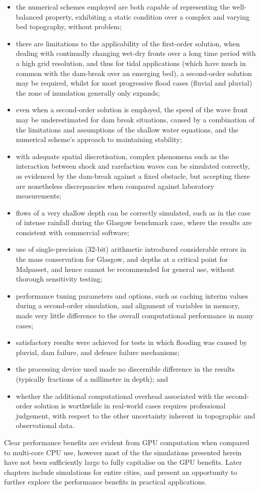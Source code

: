 \begin{itemize}
	\item the numerical schemes employed are both capable of representing the well-balanced property, exhibiting a static condition over a complex and varying bed topography, without problem;
	\item there are limitations to the applicability of the first-order solution, when dealing with continually changing wet-dry fronts over a long time period with a high grid resolution, and thus for tidal applications (which have much in common with the dam-break over an emerging bed), a second-order solution may be required, whilst for most progressive flood cases (fluvial and pluvial) the zone of inundation generally only expands;
	\item even when a second-order solution is employed, the speed of the wave front may be underestimated for dam break situations, caused by a combination of the limitations and assumptions of the shallow water equations, and the numerical scheme's approach to maintaining stability;
	\item with adequate spatial discretisation, complex phenomena such as the interaction between shock and rarefaction waves can be simulated correctly, as evidenced by the dam-break against a fixed obstacle, but accepting there are nonetheless discrepancies when compared against laboratory measurements;
	\item flows of a very shallow depth can be correctly simulated, such as in the case of intense rainfall during the Glasgow benchmark case, where the results are consistent with commercial software;
	\item use of single-precision (32-bit) arithmetic introduced considerable errors in the mass conservation for Glasgow, and depths at a critical point for Malpasset, and hence cannot be recommended for general use, without thorough sensitivity testing;
	\item performance tuning parameters and options, such as caching interim values during a second-order simulation, and alignment of variables in memory, made very little difference to the overall computational performance in many cases;
	\item satisfactory results were achieved for tests in which flooding was caused by pluvial, dam failure, and defence failure mechanisms;
	\item the processing device used made no discernible difference in the results (typically fractions of a millimetre in depth); and
	\item whether the additional computational overhead associated with the second-order solution is worthwhile in real-world cases requires professional judgement, with respect to the other uncertainty inherent in topographic and observational data.
\end{itemize}

Clear performance benefits are evident from GPU computation when compared to multi-core CPU use, however most of the the simulations presented herein have not been sufficiently large to fully capitalise on the GPU benefits. Later chapters include simulations for entire cities, and present an opportunity to further explore the performance benefits in practical applications.
